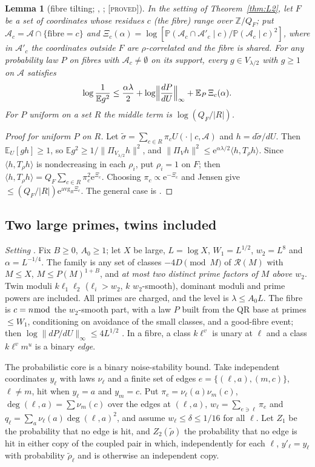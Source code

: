 \documentclass[10pt,reqno]{amsart}
\newtheorem{lemma}[theorem]{Lemma}
\theoremstyle{definition}
\theoremstyle{remark}
\newcommand{\A}{\mathcal A}
\newcommand{\cR}{\mathscr R}
\newcommand{\E}{\mathbb E}
\newcommand{\Prob}{\mathbb P}
\newcommand{\Z}{\mathbb Z}
\newcommand{\e}{\mathrm e}
\newcommand{\lab}[1]{\textup{[\textsc{#1}]}}
\begin{document}
\begin{lemma}[fibre tilting; {\cite[Lemma~6.6]{TW}}, {\cite[Lemma~2.1]{TW2}}; \lab{proved}]\label{lem:tilt}
In the setting of Theorem~\ref{thm:L2}, let $F$ be a set of coordinates
whose residues $c$ (the fibre) range over $\Z/Q_F$; put
$\A_c=\A\cap\{\text{fibre}=c\}$ and
$\Xi_c(\alpha)=\log[\Prob(\A_c\cap\A'_c\mid c)/\Prob(\A_c\mid c)^2]$, where
in $\A'_c$ the coordinates outside $F$ are $\rho$-correlated and the fibre
is shared.  For any probability law $P$ on fibres with $\A_c\neq\emptyset$
on its support, every $g\in V_{\lambda/2}$ with $g\geq1$ on $\A$ satisfies
\[
 \log\frac1{\E g^2}\leq\frac{\alpha\lambda}2+\log\Bigl\|\frac{dP}{dU}\Bigr\|_\infty+\E_P\,\Xi_c(\alpha).
\]
For $P$ uniform on a set $R$ the middle term is $\log(Q_F/|R|)$.
\end{lemma}
\begin{proof}[Proof for uniform $P$ on $R$]
Let $\tilde\sigma=\sum_{c\in R}\pi_cU(\cdot\mid c,\A)$ and $h=d\tilde\sigma/dU$.
Then $\E_U[gh]\geq1$, so $\E g^2\geq1/\|\Pi_{V_{\lambda/2}}h\|^2$, and
$\|\Pi_Vh\|^2\leq\e^{\alpha\lambda/2}\langle h,T_\rho h\rangle$.  Since
$\langle h,T_\rho h\rangle$ is nondecreasing in each $\rho_i$, put
$\rho_i=1$ on $F$; then
$\langle h,T_\rho h\rangle=Q_F\sum_{c\in R}\pi_c^2\e^{\Xi_c}$.  Choosing
$\pi_c\propto\e^{-\Xi_c}$ and Jensen give $\leq(Q_F/|R|)\e^{\mathrm{avg}_R\Xi_c}$.
The general case is \cite[Lemma~2.1]{TW2}.
\end{proof}

\subsection{Two large primes, twins included}
\emph{Setting} \cite[\S3]{TW2}.  Fix $B\geq0$, $A_0\geq1$; let $X$ be large,
$L=\log X$, $W_1=L^{1/2}$, $w_2=L^8$ and $\alpha=L^{-1/4}$.  The family is
any set of classes $-4D\pmod M$ of $\cR(M)$ with $M\leq X$,
$M\leq P(M)^{1+B}$, and \emph{at most two distinct prime factors of $M$
above $w_2$}.  Twin moduli $k\ell_1\ell_2$ ($\ell_i>w_2$, $k$ $w_2$-smooth),
dominant moduli and prime powers are included.  All primes are charged,
and the level is $\lambda\leq A_0L$.  The fibre is $c=n\bmod$ the
$w_2$-smooth part, with a law $P$ built from the QR base at primes
$\leq W_1$, conditioning on avoidance of the small classes, and a
good-fibre event; then $\log\|dP/dU\|_\infty\leq4L^{1/2}$
\cite[Lemmas~3.1--3.4]{TW2}.  In a fibre, a class $k\ell^v$ is unary at
$\ell$ and a class $k\ell^vm^u$ is a binary \emph{edge}.

The probabilistic core is a binary noise-stability bound.  Take
independent coordinates $y_\ell$ with laws $\nu_\ell$ and a finite set of
edges $e=\{(\ell,a),(m,c)\}$, $\ell\neq m$, hit when $y_\ell=a$ and
$y_m=c$.  Put $\pi_e=\nu_\ell(a)\nu_m(c)$,
$\deg(\ell,a)=\sum\nu_m(c)$ over the edges at $(\ell,a)$,
$w_\ell=\sum_{e\ni\ell}\pi_e$ and $q_\ell=\sum_a\nu_\ell(a)\deg(\ell,a)^2$,
and assume $w_\ell\leq\delta\leq1/16$ for all $\ell$.  Let $Z_1$ be the
probability that no edge is hit, and $Z_2(\tilde\rho)$ the probability that
no edge is hit in either copy of the coupled pair in which, independently
for each $\ell$, $y'_\ell=y_\ell$ with probability $\tilde\rho_\ell$ and is
otherwise an independent copy.
\end{document}

